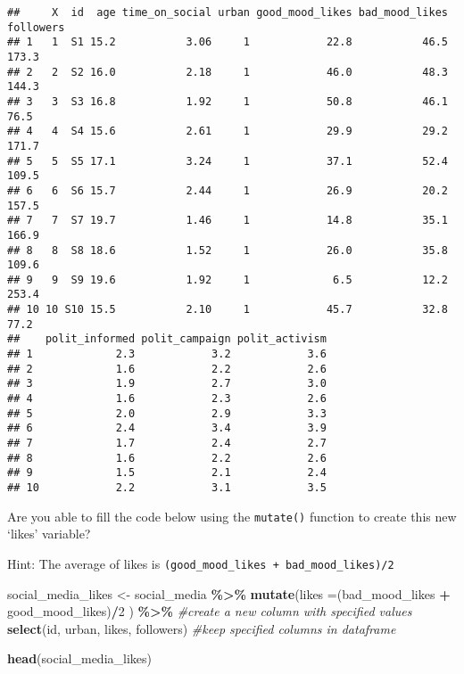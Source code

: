 \documentclass[
]{book}
\newenvironment{Shaded}{\begin{snugshade}}{\end{snugshade}}
\newcommand{\AttributeTok}[1]{\textcolor[rgb]{0.13,0.29,0.53}{#1}}
\newcommand{\CommentTok}[1]{\textcolor[rgb]{0.56,0.35,0.01}{\textit{#1}}}
\newcommand{\DecValTok}[1]{\textcolor[rgb]{0.00,0.00,0.81}{#1}}
\newcommand{\FunctionTok}[1]{\textcolor[rgb]{0.13,0.29,0.53}{\textbf{#1}}}
\newcommand{\NormalTok}[1]{#1}
\newcommand{\OtherTok}[1]{\textcolor[rgb]{0.56,0.35,0.01}{#1}}
\newcommand{\SpecialCharTok}[1]{\textcolor[rgb]{0.81,0.36,0.00}{\textbf{#1}}}
\begin{document}
\begin{verbatim}
##     X  id  age time_on_social urban good_mood_likes bad_mood_likes followers
## 1   1  S1 15.2           3.06     1            22.8           46.5     173.3
## 2   2  S2 16.0           2.18     1            46.0           48.3     144.3
## 3   3  S3 16.8           1.92     1            50.8           46.1      76.5
## 4   4  S4 15.6           2.61     1            29.9           29.2     171.7
## 5   5  S5 17.1           3.24     1            37.1           52.4     109.5
## 6   6  S6 15.7           2.44     1            26.9           20.2     157.5
## 7   7  S7 19.7           1.46     1            14.8           35.1     166.9
## 8   8  S8 18.6           1.52     1            26.0           35.8     109.6
## 9   9  S9 19.6           1.92     1             6.5           12.2     253.4
## 10 10 S10 15.5           2.10     1            45.7           32.8      77.2
##    polit_informed polit_campaign polit_activism
## 1             2.3            3.2            3.6
## 2             1.6            2.2            2.6
## 3             1.9            2.7            3.0
## 4             1.6            2.3            2.6
## 5             2.0            2.9            3.3
## 6             2.4            3.4            3.9
## 7             1.7            2.4            2.7
## 8             1.6            2.2            2.6
## 9             1.5            2.1            2.4
## 10            2.2            3.1            3.5
\end{verbatim}

Are you able to fill the code below using the \texttt{mutate()} function to create this new `likes' variable?

Hint: The average of likes is \texttt{(good\_mood\_likes\ +\ bad\_mood\_likes)/2}

\begin{Shaded}
\begin{Highlighting}[]
\NormalTok{social\_media\_likes }\OtherTok{\textless{}{-}}\NormalTok{ social\_media }\SpecialCharTok{\%\textgreater{}\%} 
  \FunctionTok{mutate}\NormalTok{(}\AttributeTok{likes =}\NormalTok{(bad\_mood\_likes }\SpecialCharTok{+}\NormalTok{ good\_mood\_likes)}\SpecialCharTok{/}\DecValTok{2}\NormalTok{ ) }\SpecialCharTok{\%\textgreater{}\%} \CommentTok{\#create a new column with specified values}
  \FunctionTok{select}\NormalTok{(id, urban, likes, followers) }\CommentTok{\#keep specified columns in dataframe}

\FunctionTok{head}\NormalTok{(social\_media\_likes)}
\end{Highlighting}
\end{Shaded}
\end{document}
